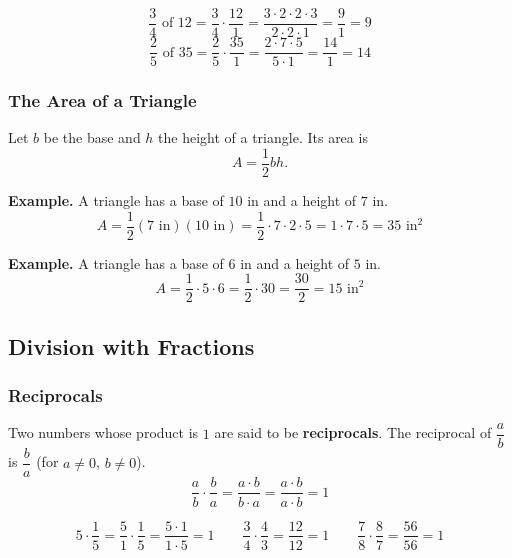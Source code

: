 \documentclass[letter]{article}
\newenvironment{keybox}
  {\begin{lrbox}{\keyboxsave}\begin{minipage}{\dimexpr\linewidth-2\fboxsep-2\fboxrule\relax}}
  {\end{minipage}\end{lrbox}\par\noindent\fbox{\usebox{\keyboxsave}}\par}
\begin{document}
\[
  \frac34\text{ of }12=\frac34\cdot\frac{12}1=\frac{3\cdot2\cdot2\cdot3}{2\cdot2\cdot1}=\frac91=9
\]
\[
  \frac25\text{ of }35=\frac25\cdot\frac{35}1=\frac{2\cdot7\cdot5}{5\cdot1}=\frac{14}1=14
\]

\subsubsection*{The Area of a Triangle}

Let $b$ be the base and $h$ the height of a triangle. Its area is
\[A=\frac12bh.\]

\begin{center}
\end{center}

\textbf{Example.} A triangle has a base of $10$ in and a height of $7$ in.
\[A=\frac12(7\text{ in})(10\text{ in})=\frac12\cdot7\cdot2\cdot5=1\cdot7\cdot5=35\text{ in}^2\]

\textbf{Example.} A triangle has a base of $6$ in and a height of $5$ in.
\[A=\frac12\cdot5\cdot6=\frac12\cdot30=\frac{30}2=15\text{ in}^2\]


\subsection{Division with Fractions}

\subsubsection*{Reciprocals}

\begin{keybox}
Two numbers whose product is $1$ are said to be \textbf{reciprocals}. The reciprocal of $\dfrac ab$ is $\dfrac ba$ (for $a\neq0$, $b\neq0$).
\[\frac ab\cdot\frac ba=\frac{a\cdot b}{b\cdot a}=\frac{a\cdot b}{a\cdot b}=1\]
\end{keybox}

\[5\cdot\frac15=\frac51\cdot\frac15=\frac{5\cdot1}{1\cdot5}=1\qquad
\frac34\cdot\frac43=\frac{12}{12}=1\qquad
\frac78\cdot\frac87=\frac{56}{56}=1\]
\end{document}
